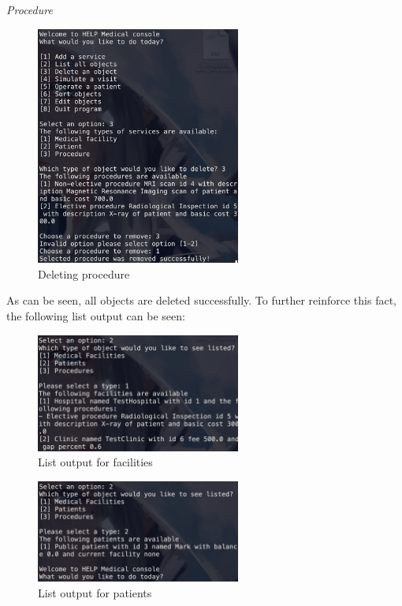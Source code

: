 \documentclass{article}
\begin{document}
	\textit{Procedure}
	\begin{figure}
		\begin{center}
			\includegraphics[width=0.6\textwidth]{figures/Deleting/Deleting_Procedure_01.png}
		\end{center}
		\caption{Deleting procedure}\label{fig:deleting_procedure_01}
	\end{figure}
	
	As can be seen, all objects are deleted successfully. To further reinforce this fact, the following list output can be seen:
	\begin{figure}
		\begin{center}
			\includegraphics[width=0.6\textwidth]{figures/Deleting/After_deletion_list_01.png}
		\end{center}
		\caption{List output for facilities}\label{fig:after_deletion_01}
	\end{figure}

	\begin{figure}
		\begin{center}
			\includegraphics[width=0.6\textwidth]{figures/Deleting/After_deletion_list_02.png}
		\end{center}
		\caption{List output for patients}\label{fig:after_deletion_02}
	\end{figure}
\end{document}
